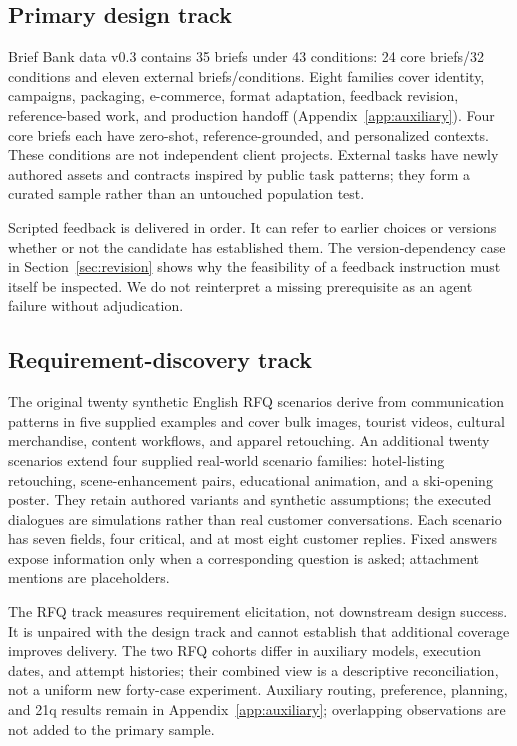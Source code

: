 \subsection{Primary design track}
Brief Bank data v0.3 contains 35 briefs under 43 conditions: 24 core briefs/32 conditions and eleven external briefs/conditions. Eight families cover identity, campaigns, packaging, e-commerce, format adaptation, feedback revision, reference-based work, and production handoff (Appendix~\ref{app:auxiliary}). Four core briefs each have zero-shot, reference-grounded, and personalized contexts. These conditions are not independent client projects. External tasks have newly authored assets and contracts inspired by public task patterns; they form a curated sample rather than an untouched population test.

Scripted feedback is delivered in order. It can refer to earlier choices or versions whether or not the candidate has established them. The version-dependency case in Section~\ref{sec:revision} shows why the feasibility of a feedback instruction must itself be inspected. We do not reinterpret a missing prerequisite as an agent failure without adjudication.

\subsection{Requirement-discovery track}
The original twenty synthetic English RFQ scenarios derive from communication patterns in five supplied examples and cover bulk images, tourist videos, cultural merchandise, content workflows, and apparel retouching. An additional twenty scenarios extend four supplied real-world scenario families: hotel-listing retouching, scene-enhancement pairs, educational animation, and a ski-opening poster. They retain authored variants and synthetic assumptions; the executed dialogues are simulations rather than real customer conversations. Each scenario has seven fields, four critical, and at most eight customer replies. Fixed answers expose information only when a corresponding question is asked; attachment mentions are placeholders.

The RFQ track measures requirement elicitation, not downstream design success. It is unpaired with the design track and cannot establish that additional coverage improves delivery. The two RFQ cohorts differ in auxiliary models, execution dates, and attempt histories; their combined view is a descriptive reconciliation, not a uniform new forty-case experiment. Auxiliary routing, preference, planning, and 21q results remain in Appendix~\ref{app:auxiliary}; overlapping observations are not added to the primary sample.
